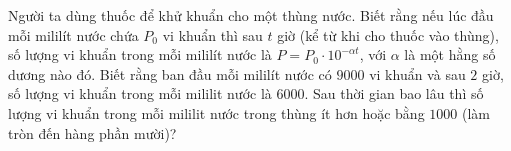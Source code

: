 \begin{ex}%
	Người ta dùng thuốc để khử khuẩn cho một thùng nước. Biết rằng nếu lúc đầu mỗi mililít nước chứa $P_{0}$ vi khuẩn thì sau $t$ giờ (kể từ khi cho thuốc vào thùng), số lượng vi khuẩn trong mỗi mililít nước là $P=P_0 \cdot 10^{-\alpha t}$, với $\alpha$ là một hằng số dương nào đó. Biết rằng ban đầu mỗi mililít nước có $9000$ vi khuẩn và sau $2$ giờ, số lượng vi khuẩn trong mỗi mililit nước là $6000$. Sau thời gian bao lâu thì số lượng vi khuẩn trong mỗi mililit nước trong thùng ít hơn hoặc bằng $1000$ (làm tròn đến hàng phần mười)?
\end{ex}
